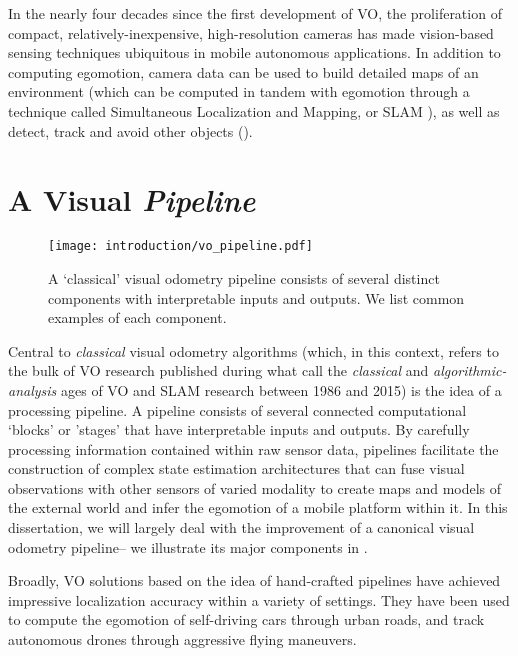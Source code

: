  
In the nearly four decades since the first development of VO, the proliferation of compact, relatively-inexpensive, high-resolution cameras has made vision-based sensing techniques ubiquitous in mobile autonomous applications. In addition to computing egomotion, camera data can be used to build detailed maps of an environment (which can be computed in tandem with egomotion through a technique called Simultaneous Localization and Mapping, or SLAM \citep{Cadena2016-ds}), as well as detect, track and avoid other objects (). 

\section{A Visual \textit{Pipeline}}

\begin{figure}
\begin{center}
		\texttt{[image: introduction/vo\_pipeline.pdf]}
		\caption{A `classical' visual odometry pipeline consists of several distinct components with interpretable inputs and outputs. We list common examples of each component. }
  	\label{fig:intro_vo_pipeline}
\end{center}
\end{figure}


Central to \textit{classical} visual odometry algorithms (which, in this context, refers to the bulk of VO research published during what \cite{Cadena2016-ds} call the \textit{classical} and \textit{algorithmic-analysis} ages of VO and SLAM research between 1986 and 2015) is the idea of a processing pipeline. A  pipeline consists of several connected computational `blocks' or 'stages' that have interpretable inputs and outputs.  By carefully processing information contained within raw sensor data, pipelines facilitate the construction of complex state estimation architectures that can fuse visual observations with other sensors of varied modality to create maps and models of the external world and infer the egomotion of a mobile platform within it. In this dissertation, we will largely deal with the improvement of a canonical visual odometry pipeline-- we illustrate its major components in . 

Broadly, VO solutions based on the idea of hand-crafted pipelines \citep{Leutenegger2015-fk, Cvisic2015-mt, Tsotsos2015, Alcantarilla2016-kv, forster2014svo, wang_stereo_2017, engel_direct_2018} have achieved impressive localization accuracy within a variety of settings. They have been used to compute the egomotion of self-driving cars through urban roads, and track autonomous drones through aggressive flying maneuvers. 

